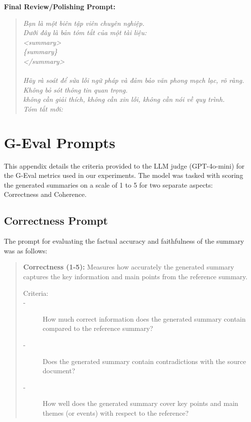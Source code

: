 \documentclass[11pt]{article}
\begin{document}
\textbf{Final Review/Polishing Prompt:}
\begin{quote}
\textit{Bạn là một biên tập viên chuyên nghiệp.\\
Dưới đây là bản tóm tắt của một tài liệu:\\
<summary>\\
\{summary\}\\
</summary>\\
\\
Hãy rà soát để sửa lỗi ngữ pháp và đảm bảo văn phong mạch lạc, rõ ràng. Không bỏ sót thông tin quan trọng.\\
không cần giải thích, không cần xin lỗi, không cần nói về quy trình.\\
Tóm tắt mới:}
\end{quote}

\section{G-Eval Prompts}
\label{sec:appendix_geval}

This appendix details the criteria provided to the LLM judge (GPT-4o-mini) for the G-Eval metrics used in our experiments. The model was tasked with scoring the generated summaries on a scale of 1 to 5 for two separate aspects: Correctness and Coherence.

\subsection{Correctness Prompt}
The prompt for evaluating the factual accuracy and faithfulness of the summary was as follows:

\begin{quote}
\textbf{Correctness (1-5):} Measures how accurately the generated summary captures the key information and main points from the reference summary.
\begin{description}
    \item[Criteria:]
    \item[-] How much correct information does the generated summary contain compared to the reference summary?
    \item[-] Does the generated summary contain contradictions with the source document?
    \item[-] How well does the generated summary cover key points and main themes (or events) with respect to the reference?
\end{description}
\end{quote}
\end{document}
